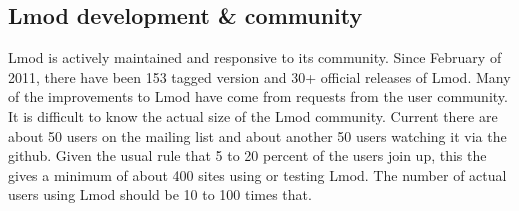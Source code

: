 \subsection{Lmod development \& community}

Lmod is actively maintained and responsive to its community.  Since
February of 2011, there have been 153 tagged version and 30+ official
releases of Lmod.  Many of the improvements to Lmod have come from
requests from the user community.  It is difficult to know the actual
size of the Lmod community.  Current there are about 50 users on the
mailing list and about another 50 users watching it via the github.  
Given the usual rule that 5 to 20 percent of the users join up, this
the gives a minimum of about 400 sites using or testing Lmod.  The
number of actual users using Lmod should be 10 to 100 times that.

%
